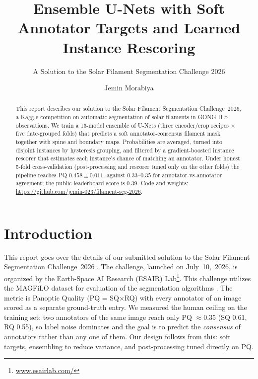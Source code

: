 \documentclass[sigconf]{acmart}
\begin{document}
\title{Ensemble U-Nets with Soft Annotator Targets and Learned Instance Rescoring}  %
\subtitle{A Solution to the Solar Filament Segmentation Challenge 2026} %


\author{Jemin Morabiya}


\begin{abstract}
    This report describes our solution to the Solar Filament Segmentation Challenge~2026, a Kaggle competition on automatic segmentation of solar filaments in GONG H-$\alpha$ observations. We train a 15-model ensemble of U-Nets (three encoder/crop recipes $\times$ five date-grouped folds) that predicts a soft annotator-consensus filament mask together with spine and boundary maps. Probabilities are averaged, turned into disjoint instances by hysteresis grouping, and filtered by a gradient-boosted instance rescorer that estimates each instance's chance of matching an annotator. Under honest 5-fold cross-validation (post-processing and rescorer tuned only on the other folds) the pipeline reaches PQ $0.458\pm0.011$, against $0.33$--$0.35$ for annotator-vs-annotator agreement; the public leaderboard score is $0.39$. Code and weights: \url{https://github.com/jemin-023/filament-seg-2026}.
\end{abstract}

\maketitle

\section{Introduction}
    This report goes over the details of our submitted solution to the Solar Filament Segmentation Challenge~2026 \cite{filament-segmentation-2026}. The challenge, launched on July~10,~2026, is organized by the Earth-Space AI Research (ESAIR) Lab\footnote{\href{https://www.esairlab.com/home}{www.esairlab.com/}}. This challenge utilizes the MAGFiLO dataset for evaluation of the segmentation algorithms \cite{ahmadzadeh2024dataset}. The metric is Panoptic Quality (PQ = SQ$\times$RQ) with every annotator of an image scored as a separate ground-truth entry. We measured the human ceiling on the training set: two annotators of the same image reach only PQ $\approx0.35$ (SQ 0.61, RQ 0.55), so label noise dominates and the goal is to predict the \emph{consensus} of annotators rather than any one of them. Our design follows from this: soft targets, ensembling to reduce variance, and post-processing tuned directly on PQ.
\end{document}
